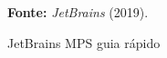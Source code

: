 \begin{figure}[h!]
\centering

\caption{\textmd{JetBrains MPS guia rápido}}
\label{fig:mpsfastrack}

\par\medskip\textbf{Fonte:} \textit{JetBrains} (2019). \par\medskip
\end{figure}
